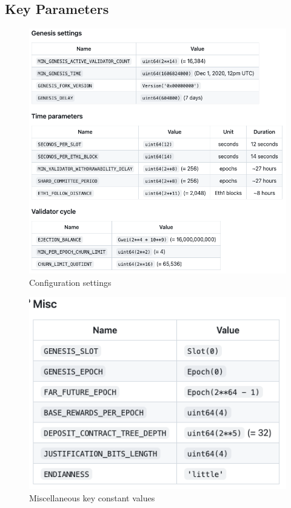 \documentclass[UTF8]{article}
\begin{document}
 \subsection{Key Parameters }
\begin{figure}[htbp]
\begin{center}
\includegraphics[width=0.7\linewidth]{images/configvalues}
\caption{Configuration settings}
\label{fig:config}
\end{center}
\end{figure}

\begin{figure}[htbp]
\begin{center}
\includegraphics[width=0.6\linewidth]{images/constants}
\caption{Miscellaneous key constant values}
\label{fig:constants}
\end{center}
\end{figure}
\end{document}
